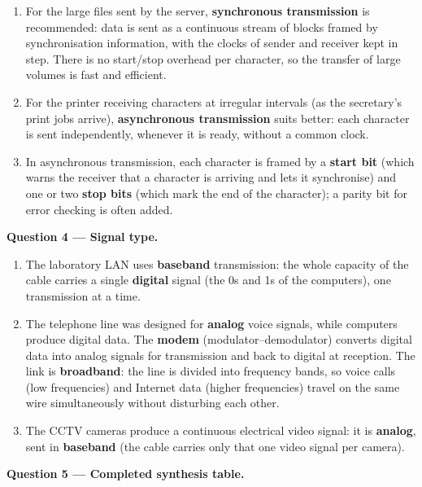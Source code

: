 \documentclass[11pt]{article}
\begin{document}
\begin{enumerate}
\item For the large files sent by the server, \textbf{synchronous transmission} is recommended: data is sent as a continuous stream of blocks framed by synchronisation information, with the clocks of sender and receiver kept in step. There is no start/stop overhead per character, so the transfer of large volumes is fast and efficient.
\item For the printer receiving characters at irregular intervals (as the secretary's print jobs arrive), \textbf{asynchronous transmission} suits better: each character is sent independently, whenever it is ready, without a common clock.
\item In asynchronous transmission, each character is framed by a \textbf{start bit} (which warns the receiver that a character is arriving and lets it synchronise) and one or two \textbf{stop bits} (which mark the end of the character); a parity bit for error checking is often added.
\end{enumerate}

\textbf{Question 4 — Signal type.}

\begin{enumerate}
\item The laboratory LAN uses \textbf{baseband} transmission: the whole capacity of the cable carries a single \textbf{digital} signal (the 0s and 1s of the computers), one transmission at a time.
\item The telephone line was designed for \textbf{analog} voice signals, while computers produce digital data. The \textbf{modem} (modulator--demodulator) converts digital data into analog signals for transmission and back to digital at reception. The link is \textbf{broadband}: the line is divided into frequency bands, so voice calls (low frequencies) and Internet data (higher frequencies) travel on the same wire simultaneously without disturbing each other.
\item The CCTV cameras produce a continuous electrical video signal: it is \textbf{analog}, sent in \textbf{baseband} (the cable carries only that one video signal per camera).
\end{enumerate}

\textbf{Question 5 — Completed synthesis table.}
\end{document}
